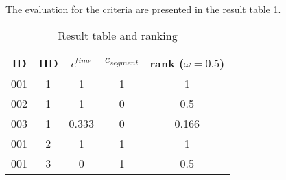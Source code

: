 \begin{example}
The evaluation for the criteria are presented in the result table \ref{tb:results}.

\begin{table}[ht]
\caption{Result table and ranking}
\centering
\begin{tabular}{c c c c c }
\hline
ID & IID &  $c^{time}$ & $c_{segment}$ & rank ($\omega=0.5$) \\ [0.5ex]
\hline
001 & 1  & 1 & 1 & 1 \\
002 & 1  & 1 & 0 & 0.5 \\
003 & 1  & 0.333  & 0 & 0.166\\
001 & 2 & 1 & 1 & 1 \\
001 & 3 & 0 & 1 & 0.5\\
\hline
\end{tabular}
\label{tb:results}
\end{table}
\end{example}




